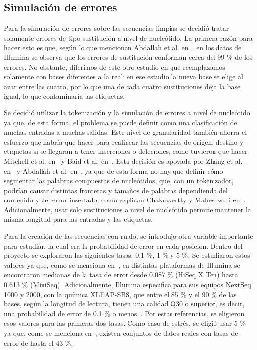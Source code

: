 \documentclass[sigconf,nonacm]{acmart}
\begin{document}
\subsection{Simulación de errores}\label{sec:simulacion}

Para la simulación de errores sobre las secuencias limpias se decidió tratar solamente errores de tipo sustitución a nivel de nucleótido. La primera razón para hacer esto es que, según lo que mencionan Abdallah et al. en~\cite{abdallah2019athena}, en los datos de Illumina se observa que los errores de sustitución conforman cerca del 99 \% de los errores. No obstante, diferimos de este otro estudio en que reemplazamos solamente con bases diferentes a la real: en ese estudio la nueva base se elige al azar entre las cuatro, por lo que una de cada cuatro sustituciones deja la base igual, lo que contaminaría las etiquetas.

Se decidió utilizar la tokenización y la simulación de errores a nivel de nucleótido ya que, de esta forma, el problema se puede definir como una clasificación de muchas entradas a muchas salidas. Este nivel de granularidad también ahorra el esfuerzo que habría que hacer para realinear las secuencias de origen, destino y etiquetas si se llegaran a tener inserciones o deleciones, como tuvieron que hacer Mitchell et al. en~\cite{mitchell2020benchmarking} y Baid et al. en~\cite{baid2021deepconsensus}. Esta decisión es apoyada por Zhang et al. en~\cite{zhang2020spelling} y Abdallah et al. en~\cite{abdallah2019athena}, ya que de esta forma no hay que definir cómo segmentar las palabras compuestas de nucleótidos, que, con un tokenizador, podrían causar distintas fronteras y tamaños de palabras dependiendo del contenido y del error insertado, como explican Chakravertty y Maheshwari en~\cite{chakravertty2026vestige}. Adicionalmente, usar solo sustituciones a nivel de nucleótido permite mantener la misma longitud para las entradas y las etiquetas.

Para la creación de las secuencias con ruido, se introdujo otra variable importante para estudiar, la cual era la probabilidad de error en cada posición. Dentro del proyecto se exploraron las siguientes tasas: 0.1 \%, 1 \% y 5 \%. Se estudiaron estos valores ya que, como se menciona en~\cite{stoler2021sequencing}, en distintas plataformas de Illumina se encontraron medianas de la tasa de error desde 0.087 \% (HiSeq X Ten) hasta 0.613 \% (MiniSeq). Adicionalmente, Illumina especifica para sus equipos NextSeq 1000 y 2000, con la química XLEAP-SBS, que entre el 85 \% y el 90 \% de las bases, según la longitud de lectura, tienen una calidad Q30 o superior, es decir, una probabilidad de error de 0.1 \% o menos~\cite{illumina_nextseq}. Por estas referencias, se eligieron esos valores para las primeras dos tasas. Como caso de estrés, se eligió usar 5 \% ya que, como se menciona en~\cite{abdallah2019athena}, existen conjuntos de datos reales con tasas de error de hasta el 43 \%.
\end{document}
